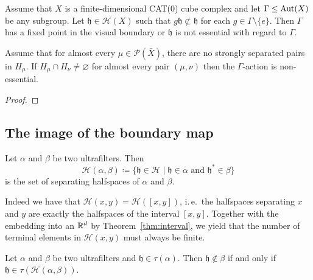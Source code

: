 \begin{thm}
  \label{thm:cs-flipping}
  Assume that \(X\) is a finite-dimensional CAT(0) cube complex and let \(\Gamma \leq \operatorname{Aut}(X)\) be any subgroup. Let \(\mathfrak{h} \in \mathcal{H}(X)\) such that \(g\mathfrak{h} \not\subset \mathfrak{h}\) for each \(g \in \Gamma \setminus \{e\}\). Then \(\Gamma\) has a fixed point in the visual boundary or \(\mathfrak{h}\) is not essential with regard to \(\Gamma\).
\end{thm}

\begin{cor}[{\cite[Corollary~4.21]{MR3509968}}]
  \label{cor:4.21}
  Assume that for almost every \(\mu \in \mathcal{P}(\bar X)\), there are no strongly separated pairs in \(H_\mu\). If \(H_\mu \cap H_\nu \neq \varnothing\) for almost every pair \((\mu, \nu)\) then the \(\Gamma\)-action is non-essential.
\end{cor}

\begin{proof}
  
\end{proof}

\subsection{The image of the boundary map}
\label{sec:nt-uf}


\begin{defin}
  Let \(\alpha\) and \(\beta\) be two ultrafilters. Then
  \[
    \mathcal{H}(\alpha,\beta) \coloneqq \{\mathfrak{h} \in \mathcal{H} \mid \mathfrak{h} \in \alpha \text{ and } \mathfrak{h}^\ast \in \beta\}
  \]
  is the set of separating halfspaces of \(\alpha\) and \(\beta\).
\end{defin}

\begin{rem}
  \label{rem:interval}
  Indeed we have that \(\mathcal{H}(x,y) = \mathcal{H}([x,y])\), i.\,e.\ the halfspaces separating \(x\) and \(y\) are exactly the halfspaces of the interval \([x,y]\). Together with the embedding into an \(\mathbb{R}^d\) by Theorem~\ref{thm:interval}, we yield that the number of terminal elements in \(\mathcal{H}(x,y)\) must always be finite.
\end{rem}

\begin{lemma}[{\cite[Lemma~4.12]{MR3509968}}]
  \label{lem:4.12}
  Let \(\alpha\) and \(\beta\) be two ultrafilters and \(\mathfrak{h} \in \tau(\alpha)\). Then \(\mathfrak{h} \notin \beta\) if and only if \(\mathfrak{h} \in \tau(\mathcal{H}(\alpha,\beta))\).
\end{lemma}

